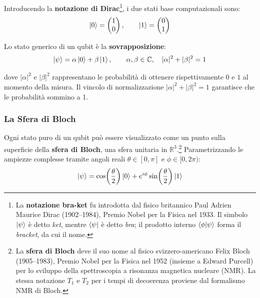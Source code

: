 \begin{onehalfspace}
Introducendo la \textbf{notazione di Dirac}\footnote{La \textbf{notazione bra-ket} fu introdotta dal fisico britannico Paul Adrien Maurice Dirac (1902--1984), Premio Nobel per la Fisica nel 1933. Il simbolo $\ket{\psi}$ è detto \textit{ket}, mentre $\bra{\psi}$ è detto \textit{bra}; il prodotto interno $\braket{\phi|\psi}$ forma il \textit{bracket}, da cui il nome.}, i due stati base computazionali sono:
\begin{equation}
    \ket{0} = \begin{pmatrix} 1 \\ 0 \end{pmatrix}, \qquad
    \ket{1} = \begin{pmatrix} 0 \\ 1 \end{pmatrix}
\end{equation}

Lo stato generico di un qubit è la \textbf{sovrapposizione}:
\begin{equation}
    \ket{\psi} = \alpha\ket{0} + \beta\ket{1}, \qquad \alpha, \beta \in \mathbb{C}, \quad |\alpha|^2 + |\beta|^2 = 1
\end{equation}

dove $|\alpha|^2$ e $|\beta|^2$ rappresentano le probabilità di ottenere rispettivamente $0$ e $1$ al momento della misura. Il vincolo di normalizzazione $|\alpha|^2 + |\beta|^2 = 1$ garantisce che le probabilità sommino a 1.

\subsubsection{La Sfera di Bloch}

Ogni stato puro di un qubit può essere visualizzato come un punto sulla superficie della \textbf{sfera di Bloch}, una sfera unitaria in $\mathbb{R}^3$.\footnote{La \textbf{sfera di Bloch} deve il suo nome al fisico svizzero-americano Felix Bloch (1905--1983), Premio Nobel per la Fisica nel 1952 (insieme a Edward Purcell) per lo sviluppo della spettroscopia a risonanza magnetica nucleare (\ac{NMR}). La stessa notazione $T_1$ e $T_2$ per i tempi di decoerenza proviene dal formalismo NMR di Bloch.} Parametrizzando le ampiezze complesse tramite angoli reali $\theta \in [0, \pi]$ e $\phi \in [0, 2\pi)$:
\begin{equation}
    \ket{\psi} = \cos\!\left(\frac{\theta}{2}\right)\ket{0} + e^{i\phi}\sin\!\left(\frac{\theta}{2}\right)\ket{1}
\end{equation}


\end{onehalfspace}

